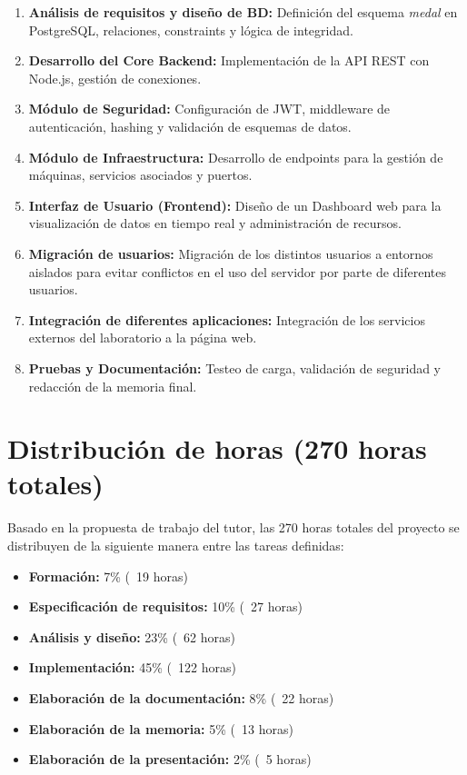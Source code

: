 \documentclass[11pt,a4paper]{article}
\begin{document}
\begin{enumerate}[label=\textbf{T\arabic*.}]
    \item \textbf{Análisis de requisitos y diseño de BD:} Definición del esquema \textit{medal} en PostgreSQL, relaciones, constraints y lógica de integridad.
    \item \textbf{Desarrollo del Core Backend:} Implementación de la API REST con Node.js, gestión de conexiones.
    \item \textbf{Módulo de Seguridad:} Configuración de JWT, middleware de autenticación, hashing y validación de esquemas de datos.
    \item \textbf{Módulo de Infraestructura:} Desarrollo de endpoints para la gestión de máquinas, servicios asociados y puertos.
    \item \textbf{Interfaz de Usuario (Frontend):} Diseño de un Dashboard web para la visualización de datos en tiempo real y administración de recursos.
    \item \textbf{Migración de usuarios:} Migración de los distintos usuarios a entornos aislados para evitar conflictos en el uso del servidor por parte de diferentes usuarios. 
    \item \textbf{Integración de diferentes aplicaciones:} Integración de los servicios externos del laboratorio a la página web.
    \item \textbf{Pruebas y Documentación:} Testeo de carga, validación de seguridad y redacción de la memoria final.
\end{enumerate}

\section{Distribución de horas (270 horas totales)}

Basado en la propuesta de trabajo del tutor, las 270 horas totales del proyecto se distribuyen de la siguiente manera entre las tareas definidas:

\begin{itemize}
    \item \textbf{Formación:} 7\% (~19 horas)
    \item \textbf{Especificación de requisitos:} 10\% (~27 horas)
    \item \textbf{Análisis y diseño:} 23\% (~62 horas)
    \item \textbf{Implementación:} 45\% (~122 horas)
    \item \textbf{Elaboración de la documentación:} 8\% (~22 horas)
    \item \textbf{Elaboración de la memoria:} 5\% (~13 horas)
    \item \textbf{Elaboración de la presentación:} 2\% (~5 horas)
\end{itemize}
\end{document}
